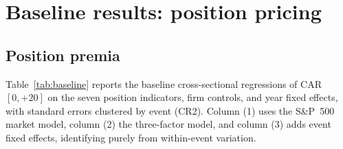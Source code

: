 \documentclass[review,12pt,authoryear]{elsarticle}
\begin{document}
\section{Baseline results: position pricing}\label{sec:results}

\subsection{Position premia}

Table~\ref{tab:baseline} reports the baseline cross-sectional regressions of
CAR$[0,+20]$ on the seven position indicators, firm controls, and year fixed
effects, with standard errors clustered by event (CR2). Column (1) uses the
S\&P~500 market model, column (2) the three-factor model, and column (3) adds
event fixed effects, identifying purely from within-event variation.
\end{document}
